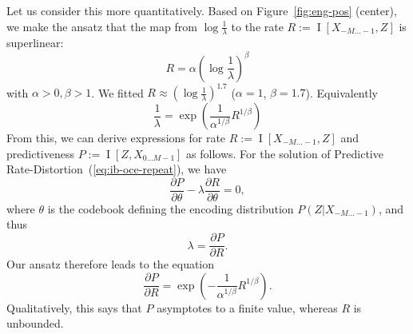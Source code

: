 \documentclass[entropy,article,submit,moreauthors,pdftex,10pt,a4paper]{Definitions/mdpi}
\newif \ifcomment
\newcommand\rljf[1]{\ifcomment{{\color{blue}(#1)}}\else{}\fi}
\begin{document}
Let us consider this more quantitatively.
Based on Figure~\ref{fig:eng-pos} (center), we make the ansatz that the map from $\log\frac{1}{\lambda}$ to the rate $R := \operatorname{I}[X_{-M\dots -1}, Z]$ is superlinear:
\begin{equation}\label{eq:r-alpha-beta}
	R = \alpha \left(\log\frac{1}{\lambda}\right)^\beta
\end{equation}
	with $\alpha>0, \beta>1$.
We fitted $R \approx \left(\log\frac{1}{\lambda}\right)^{1.7}$ ($\alpha=1$, $\beta=1.7$).
Equivalently
\begin{equation}
\frac{1}{\lambda} = \exp\left(\frac{1}{\alpha^{1/\beta}} R^{1/\beta}\right)
\end{equation}
From this, we can derive expressions for rate $R := \operatorname{I}[X_{-M\dots -1}, Z]$ and predictiveness $P := \operatorname{I}[Z, X_{0 \dots M-1}]$ as follows.
For the solution of Predictive Rate-Distortion~(\ref{eq:ib-oce-repeat}), we have
\begin{equation}
	\frac{\partial P}{\partial \theta} - \lambda \frac{\partial R}{\partial \theta} = 0,
\end{equation}
where $\theta$ is the codebook defining the encoding distribution $P(Z|X_{-M\dots -1})$, and thus
\begin{equation}
\lambda =	\frac{\partial P}{\partial R}.
\end{equation}
Our ansatz therefore leads to the equation
\begin{equation}\label{eq:derivatives}
\frac{\partial P}{\partial R} = \exp\left(-\frac{1}{\alpha^{1/\beta}} R^{1/\beta}\right). %
\end{equation}
Qualitatively, this says that $P$ asymptotes to a finite value, whereas $R$ is unbounded. %
\end{document}
